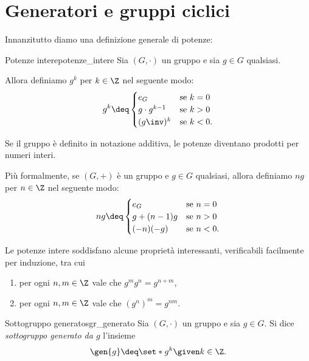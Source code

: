 \section{Generatori e gruppi ciclici}

Innanzitutto diamo una definizione generale di potenze:
\begin{definition}{Potenze intere}{potenze_intere}
    Sia $(G, \cdot)$ un gruppo e sia $g \in G$ qualsiasi. 
    
    Allora definiamo $g^k$ per $k \in \Z$ nel seguente modo: \[
        g^k \deq \begin{cases}
            e_G &\text{se } k = 0\\
            g \cdot g^{k-1} &\text{se } k > 0\\
            (g\inv)^k &\text{se } k < 0.
        \end{cases}    
    \]
\end{definition}

Se il gruppo è definito in notazione additiva, le potenze diventano prodotti per numeri interi. 

Più formalmente, se $(G, +)$ è un gruppo e $g \in G$ qualsiasi, allora definiamo $ng$ per $n \in \Z$ nel seguente modo: \[
    ng \deq \begin{cases}
        e_G &\text{se } n = 0\\
        g + (n-1)g &\text{se } n > 0\\
        (-n)(-g) &\text{se } n < 0.
    \end{cases}   
\]

Le potenze intere soddisfano alcune proprietà interessanti, verificabili facilmente per induzione, tra cui \begin{enumerate}[label={(P\arabic*)}, ref={(P\arabic*)}]
    \item per ogni $n, m \in \Z$ vale che $g^mg^n = g^{n+m}$,
    \item per ogni $n, m \in \Z$ vale che ${(g^n)}^m = g^{nm}$.
\end{enumerate}

\begin{definition}
    {Sottogruppo generato}{sgr_generato}
    Sia $(G, \cdot)$ un gruppo e sia $g \in G$.
    Si dice \emph{sottogruppo generato da $g$} l'insieme \[
        \gen{g} \deq \set*{g^k \given k \in \Z}.    
    \]
\end{definition}

